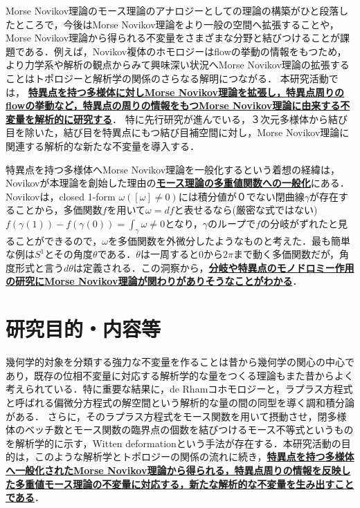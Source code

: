 \documentclass[11pt,a4j,dvipdfmx]{jarticle} 					%
\newcommand{\研究課題名}{象の卵}
\newcommand{\研究機関名}{京都大学}
\newcommand{\研究代表者氏名}{福士　謙二　　　}
\begin{document}
\noindent

Morse Novikov理論のモース理論のアナロジーとしての理論の構築がひと段落したところで，今後はMorse Novikov理論をより一般の空間へ拡張することや，Morse Novikov理論から得られる不変量をさまざまな分野と結びつけることが課題である．例えば，Novikov複体のホモロジーはflowの挙動の情報をもつため，より力学系や解析の観点からみて興味深い状況へMorse Novikov理論の拡張することはトポロジーと解析学の関係のさらなる解明につながる．
本研究活動では，
\textbf{\ul{特異点を持つ多様体に対しMorse Novikov理論を拡張し，特異点周りのflowの挙動など，特異点の周りの情報をもつMorse Novikov理論に由来する不変量を解析的に研究する}}．
特に先行研究が進んでいる，３次元多様体から結び目を除いた，結び目を特異点にもつ結び目補空間に対し，Morse Novikov理論に関連する解析的な新たな不変量を導入する．


\noindent

特異点を持つ多様体へMorse Novikov理論を一般化するという着想の経緯は，Novikovが本理論を創始した理由の\textbf{\ul{モース理論の多重値関数への一般化}}にある．
Novikovは，closed 1-form $\omega([\omega]\neq0)$には積分値が０でない閉曲線$\gamma$が存在することから，多価関数$f$を用いて$\omega=df$と表せるなら(厳密な式ではない) $f(\gamma(1))-f(\gamma(0)) = \int_{\gamma}\omega\neq0$となり，$\gamma$のループで$f$の分岐がずれたと見ることができるので，$\omega$を多価関数を外微分したようなものと考えた．最も簡単な例は$S^1$とその角度$\theta$である．$\theta$は一周すると0から$2\pi$まで動く多価関数だが，角度形式と言う$d\theta$は定義される．この洞察から，\textbf{\ul{分岐や特異点のモノドロミー作用の研究にMorse Novikov理論が関わりがありそうなことがわかる}}．









\section{研究目的・内容等}

\noindent
{}

幾何学的対象を分類する強力な不変量を作ることは昔から幾何学の関心の中心であり，既存の位相不変量に対応する解析学的な量をつくる理論もまた昔からよく考えられている．特に重要な結果に，de Rhamコホモロジーと，ラプラス方程式と呼ばれる偏微分方程式の解空間という解析的な量の間の同型を導く調和積分論がある．
さらに，そのラプラス方程式をモース関数を用いて摂動させ，閉多様体のベッチ数とモース関数の臨界点の個数を結びつけるモース不等式というものを解析学的に示す，Witten deformationという手法が存在する．本研究活動の目的は，このような解析学とトポロジーの関係の流れに続き，\textbf{\ul{特異点を持つ多様体へ一般化されたMorse Novikov理論から得られる，特異点周りの情報を反映した多重値モース理論の不変量に対応する，新たな解析的な不変量を生み出すことである}}．
\end{document}
